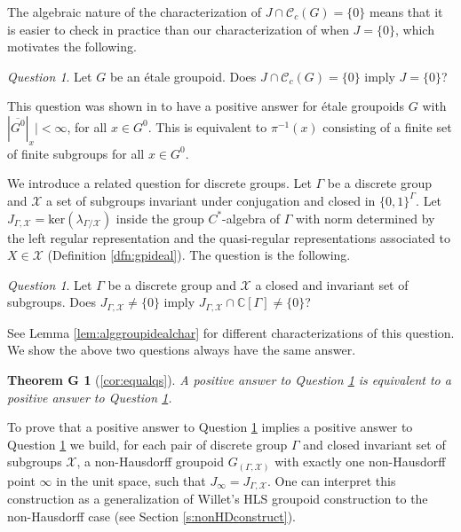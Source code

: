 \documentclass[a4paper, 12pt]{amsart}
\newtheorem*{thmG}{Theorem G}
\theoremstyle{definition}
\theoremstyle{remark}
\newtheorem{qtn}[thm]{Question}
\numberwithin{equation}{section}
\begin{document}
The algebraic nature of the characterization of $J\cap \mathscr{C}_{c}(G) = \{0\}$ means that it is easier to check in practice than our characterization of when $J = \{0\}$, which motivates the following.

\begin{qtn}
\label{qtn1}
    Let $G$ be an \'etale groupoid. Does $J\cap\mathscr{C}_{c}(G) = \{0\}$ imply $J = \{0\}$?
\end{qtn}

This question was shown in \cite[Theorem~4.7]{BGHL25} to have a positive answer for \'etale groupoids $G$ with $|\overline{G^{0}}|_{x}| < \infty$, for all $x\in G^{0}$. This is equivalent to $\pi^{-1}(x)$ consisting of a finite set of finite subgroups for all $x\in G^{0}$.

We introduce a related question for discrete groups. Let $\Gamma$ be a discrete group and $\mathcal{X}$ a set of subgroups invariant under conjugation and closed in $\{0,1\}^{\Gamma}$. Let $J_{\Gamma,\mathcal{X}}= \text{ker}(\lambda_{\Gamma/\mathcal{X}})$ inside the group $C^{*}$-algebra of $\Gamma$ with norm determined by the left regular representation and the quasi-regular representations associated to $X\in\mathcal{X}$ (Definition \ref{dfn:gpideal}). The question is the following.

\begin{qtn}
\label{qtn2}
    Let $\Gamma$ be a discrete group and $\mathcal{X}$ a closed and invariant set of subgroups. Does $J_{\Gamma,\mathcal{X}} \neq \{0\}$ imply  $J_{\Gamma,\mathcal{X}}\cap\mathbb{C}[\Gamma] \neq \{0\}$?
\end{qtn}

See Lemma \ref{lem:alggroupidealchar} for different characterizations of this question. We show the above two questions always have the same answer.

\begin{thmG}[\ref{cor:equalqs}]
    A positive answer to Question \ref{qtn1} is equivalent to a positive answer to Question \ref{qtn2}.
\end{thmG}
To prove that a positive answer to Question \ref{qtn1} implies a positive answer to Question \ref{qtn2} we build, for each pair of discrete group $\Gamma$ and closed invariant set of subgroups $\mathcal{X}$, a non-Hausdorff groupoid $G_{(\Gamma,\mathcal{X})}$ with exactly one non-Hausdorff point $\infty$ in the unit space, such that $J_{\infty} = J_{\Gamma,\mathcal{X}}$. One can interpret this construction as a generalization of Willet's HLS groupoid construction \cite{W15}  to the non-Hausdorff case (see Section \ref{s:nonHDconstruct}).
\end{document}
